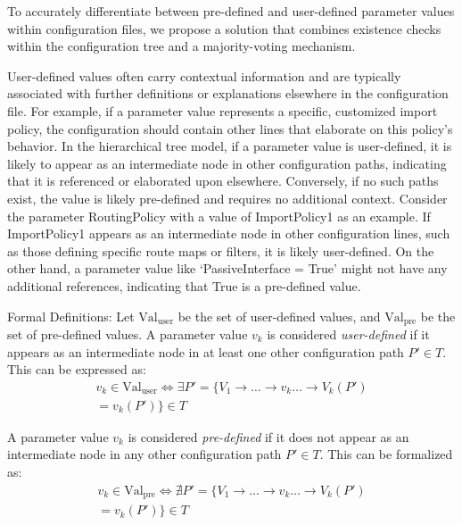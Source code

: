 To accurately differentiate between pre-defined and user-defined parameter values within configuration files, we propose a solution that combines existence checks within the configuration tree and a majority-voting mechanism.

User-defined values often carry contextual information and are typically associated with further definitions or explanations elsewhere in the configuration file. For example, if a parameter value represents a specific, customized import policy, the configuration should contain other lines that elaborate on this policy's behavior. In the hierarchical tree model, if a parameter value is user-defined, it is likely to appear as an intermediate node in other configuration paths, indicating that it is referenced or elaborated upon elsewhere. Conversely, if no such paths exist, the value is likely pre-defined and requires no additional context. Consider the parameter RoutingPolicy with a value of ImportPolicy1 as an example. If ImportPolicy1 appears as an intermediate node in other configuration lines, such as those defining specific route maps or filters, it is likely user-defined. On the other hand, a parameter value like `PassiveInterface = True' might not have any additional references, indicating that True is a pre-defined value.

Formal Definitions:
Let \( \text{Val}_{\text{user}} \) be the set of user-defined values, and \( \text{Val}_{\text{pre}} \) be the set of pre-defined values.
A parameter value \( v_k \) is considered \textit{user-defined} if it appears as an intermediate node in at least one other configuration path \( P' \in T \). This can be expressed as:
\begin{multline*}
v_k \in \text{Val}_{\text{user}} \iff \exists P' = \{ V_1 \rightarrow \dots \rightarrow v_k \dots \rightarrow V_k(P') \\ = v_k(P') \} \in T
\end{multline*}

A parameter value \( v_k \) is considered \textit{pre-defined} if it does not appear as an intermediate node in any other configuration path \( P' \in T \). This can be formalized as:
\begin{multline*}
v_k \in \text{Val}_{\text{pre}} \iff \nexists P' = \{ V_1 \rightarrow \dots \rightarrow v_k \dots \rightarrow V_k(P') \\ = v_k(P') \} \in T
\end{multline*}


